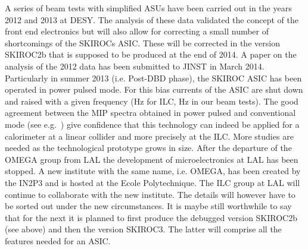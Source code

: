 A series of beam tests with simplified ASUs have been carried out in the years 2012 and 2013 at DESY. The analysis of these data validated the concept of the front end electronics but will also allow for correcting a small number of shortcomings of the SKIROCs ASIC. These will be corrected in the version SKIROC2b that is supposed to be produced at the end of 2014. A paper on the analysis of the 2012 data has been submitted to JINST in March 2014.
Particularly in summer 2013 (i.e. Post-DBD phase), the SKIROC ASIC has been operated in power pulsed mode. For this bias currents of the ASIC are shut down and raised with a given frequency (\unit[5]{Hz} for ILC, \unit[10]{Hz} in our beam tests). The good agreement between the MIP spectra obtained in power pulsed and conventional mode (see e.g.~\cite{Poschl:Giessen:ECAL:2014}) give confidence that this technology can indeed be applied for a calorimeter at a linear collider and more precisely at the ILC. More studies are needed as the technological prototype grows in size.
After the departure of the OMEGA group from LAL the development of microelectronics at LAL has been stopped. A new institute with the same name, i.e. OMEGA, has been created by the IN2P3 and is hosted at the Ecole Polytechnique. The ILC group at LAL will continue to collaborate with the new institute. The details will however have to be sorted out under the new circumstances. It is maybe still worthwhile to say that for the next it is planned to first produce the debugged version SKIROC2b (see above) and then the version SKIROC3. The latter will comprise all the features needed for an ASIC.

